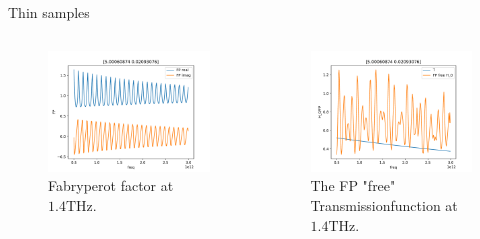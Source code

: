 \documentclass[aspectratio=1610, 9pt]{beamer}
\begin{document}
\begin{frame}{Thin samples}
  \begin{center}
    \begin{columns}
      \begin{column}{0.5\textwidth}
        \begin{figure}
        \includegraphics[width=\textwidth]{images/GAP/FPat1.4000001399994897.pdf}
        \caption{Fabryperot factor at $1.4\si{\tera\hertz}$.}
        \end{figure}
      \end{column}
      \begin{column}{0.5\textwidth}
        \begin{figure}
        \includegraphics[width=\textwidth]{images/GAP/FP_freeH_01.4000001399994897.pdf}
        \caption{The FP "free" Transmissionfunction at $1.4\si{\tera\hertz}$.}
        \end{figure}
      \end{column}
    \end{columns}
  \end{center}
\end{frame}
\end{document}
